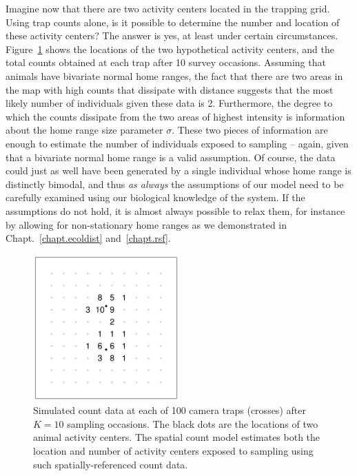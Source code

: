 Imagine now that there are two activity centers located in the trapping
grid. Using trap counts alone, %
is it possible to determine the number and location of these activity
centers? The answer is yes, at least under certain circumstances.
Figure~\ref{chapt-unmarked.fig.heur} %
shows the locations of the two hypothetical activity centers, and the total
counts obtained at each trap after 10 survey occasions.
Assuming that animals have bivariate normal home
ranges, the fact that there are two areas in the map with high counts
that dissipate with distance suggests that the most likely number of
individuals given these data is 2. Furthermore, the degree to which
the counts dissipate from the two areas of highest intensity is
information about the home range size parameter $\sigma$. These two
pieces of information are enough to estimate the number of
individuals exposed to sampling -- again, given
that a bivariate normal home range is a valid assumption. Of course,
the data could just as well have been generated by a single individual
whose home range is distinctly bimodal, and thus \textit{as always}
the assumptions of our model need to be carefully examined using our
biological knowledge of the system. If the assumptions
do not hold, it is almost always possible to relax them, for instance
by allowing for non-stationary home ranges as we demonstrated in
Chapt.~\ref{chapt.ecoldist} and~\ref{chapt.rsf}.

\begin{figure}%
\centering
\includegraphics[width=0.5\textwidth]{Ch18-Unmarked/figs/heuristic}
\caption{Simulated count data at each of 100 camera traps
  (crosses) after $K=10$ sampling occasions. The black dots are the
  locations of two animal activity centers. The
  spatial count model estimates %
  both the location and number of activity centers exposed to
  sampling using such spatially-referenced count data.}
\label{chapt-unmarked.fig.heur}
\end{figure}




